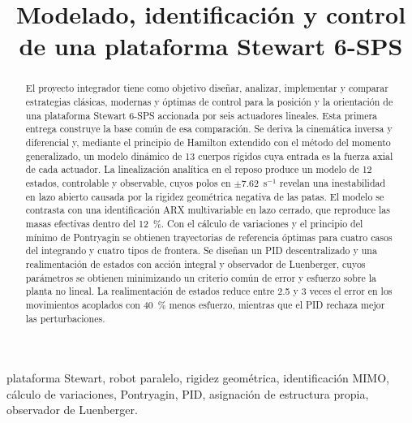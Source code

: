 \documentclass[conference]{IEEEtran}
\begin{document}
\title{Modelado, identificación y control de una plataforma Stewart 6-SPS}

\author{
}

\maketitle

\begin{abstract}
El proyecto integrador tiene como objetivo diseñar, analizar, implementar y comparar estrategias clásicas, modernas y óptimas de control para la posición y la orientación de una plataforma Stewart 6-SPS accionada por seis actuadores lineales. Esta primera entrega construye la base común de esa comparación. Se deriva la cinemática inversa y diferencial y, mediante el principio de Hamilton extendido con el método del momento generalizado, un modelo dinámico de 13 cuerpos rígidos cuya entrada es la fuerza axial de cada actuador. La linealización analítica en el reposo produce un modelo de 12 estados, controlable y observable, cuyos polos en $\pm7.62$~s$^{-1}$ revelan una inestabilidad en lazo abierto causada por la rigidez geométrica negativa de las patas. El modelo se contrasta con una identificación ARX multivariable en lazo cerrado, que reproduce las masas efectivas dentro del 12~\%. Con el cálculo de variaciones y el principio del mínimo de Pontryagin se obtienen trayectorias de referencia óptimas para cuatro casos del integrando y cuatro tipos de frontera. Se diseñan un PID descentralizado y una realimentación de estados con acción integral y observador de Luenberger, cuyos parámetros se obtienen minimizando un criterio común de error y esfuerzo sobre la planta no lineal. La realimentación de estados reduce entre 2.5 y 3 veces el error en los movimientos acoplados con 40~\% menos esfuerzo, mientras que el PID rechaza mejor las perturbaciones.
\end{abstract}

\begin{IEEEkeywords}
plataforma Stewart, robot paralelo, rigidez geométrica, identificación MIMO, cálculo de variaciones, Pontryagin, PID, asignación de estructura propia, observador de Luenberger.
\end{IEEEkeywords}
\end{document}
